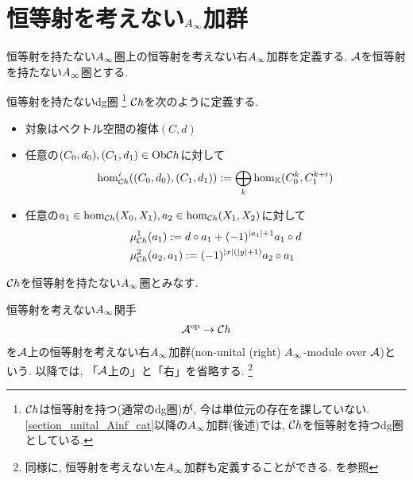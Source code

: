 \documentclass[uplatex, a4paper, 14Q, dvipdfmx]{jsarticle}
\begin{document}

  

\section{恒等射を考えない\texorpdfstring{$A_{\infty}$}{Ainf}加群}

恒等射を持たない$A_{\infty}$圏上の恒等射を考えない右$A_{\infty}$加群を定義する. 
$\mathcal{A}$を恒等射を持たない$A_{\infty}$圏とする. 

\begin{definition}[複体の圏$\Ch$]
  恒等射を持たないdg圏
  \footnote{
    $\Ch$は恒等射を持つ(通常のdg圏)が, 今は単位元の存在を課していない. 
    \cref{section_unital_Ainf_cat}以降の$A_{\infty}$加群(後述)では, $\Ch$を恒等射を持つdg圏としている. 
  }
  $\Ch$を次のように定義する. 
  \begin{itemize}
    \item 対象はベクトル空間の複体$(C,d)$
    \item 任意の$(C_0,d_0), (C_1,d_1) \in \mathrm{Ob}\mathcal{C} h$に対して
    \begin{align*}
      \hom_{\mathcal{C} h}^i((C_0,d_0), (C_1,d_1)) 
      := \bigoplus_{k} \hom_{\mathbb{K}}(C_0^k,C_1^{k+i})
    \end{align*}
    \item 任意の$a_1 \in \hom_{\mathcal{C} h}(X_0,X_1), a_2 \in \hom_{\mathcal{C} h}(X_1,X_2)$に対して 
    \begin{align*}
      &\mu^1_{\mathcal{C} h}(a_1) := d \circ a_1 + (-1)^{|a_1|+1} a_1 \circ d \\
      &\mu^2_{\mathcal{C} h}(a_2,a_1) := (-1)^{|x|(|y|+1)} a_2 \circ a_1
    \end{align*}
  \end{itemize}
  $\Ch$を恒等射を持たない$A_{\infty}$圏とみなす. 
\end{definition}

\begin{definition}
  恒等射を考えない$A_{\infty}$関手
  \begin{align*}
    \mathcal{A}^\mathrm{op} \to \mathcal{C} h
  \end{align*}
  を$\mathcal{A}$上の恒等射を考えない右$A_{\infty}$加群(non-unital (right) $A_{\infty}$-module over $\mathcal{A}$)という. 
  以降では, 「$\mathcal{A}$上の」と「右」を省略する. 
  \footnote{
    同様に, 恒等射を考えない左$A_{\infty}$加群も定義することができる. \cite{Fuk02}を参照
  }
\end{definition}
\end{document}
